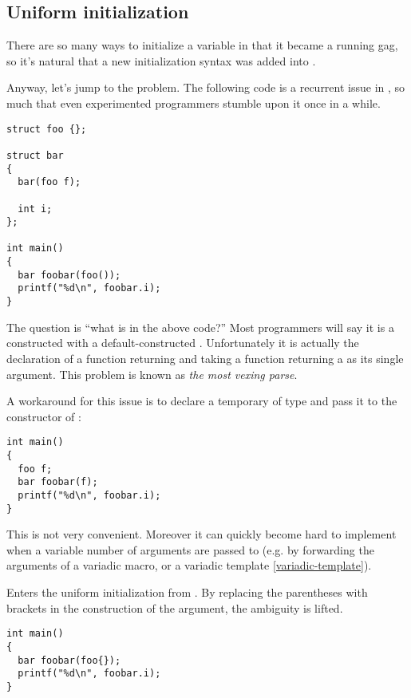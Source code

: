\subsection{Uniform initialization}
\label{uniform-initialization}

There are so many ways to initialize a variable in \cpp{} that it
became a running gag, so it's natural that a new initialization syntax
was added into .

Anyway, let's jump to the problem. The following code is a recurrent
issue in \cpp{}, so much that even experimented programmers stumble
upon it once in a while.

\begin{lstlisting}
struct foo {};

struct bar
{
  bar(foo f);

  int i;
};

int main()
{
  bar foobar(foo());
  printf("%d\n", foobar.i);
}
\end{lstlisting}

The question is ``what is  in the above code?'' Most
\cpp{} programmers will say it is a  constructed with a
default-constructed . Unfortunately it is actually the
declaration of a function returning  and taking a function
returning a  as its single argument. This problem is known
as \emph{the most vexing parse}.

A workaround for this issue is to declare a temporary of type
 and pass it to the constructor of :

\begin{lstlisting}
int main()
{
  foo f;
  bar foobar(f);
  printf("%d\n", foobar.i);
}
\end{lstlisting}

This is not very convenient. Moreover it can quickly become hard to
implement when a variable number of arguments are passed to
 (e.g. by forwarding the arguments of a variadic macro,
or a variadic template \ref{variadic-template}).

\bigskip

Enters the uniform initialization from . By replacing the
parentheses with brackets in the construction of the argument, the
ambiguity is lifted.

\begin{lstlisting}
int main()
{
  bar foobar(foo{});
  printf("%d\n", foobar.i);
}
\end{lstlisting}

